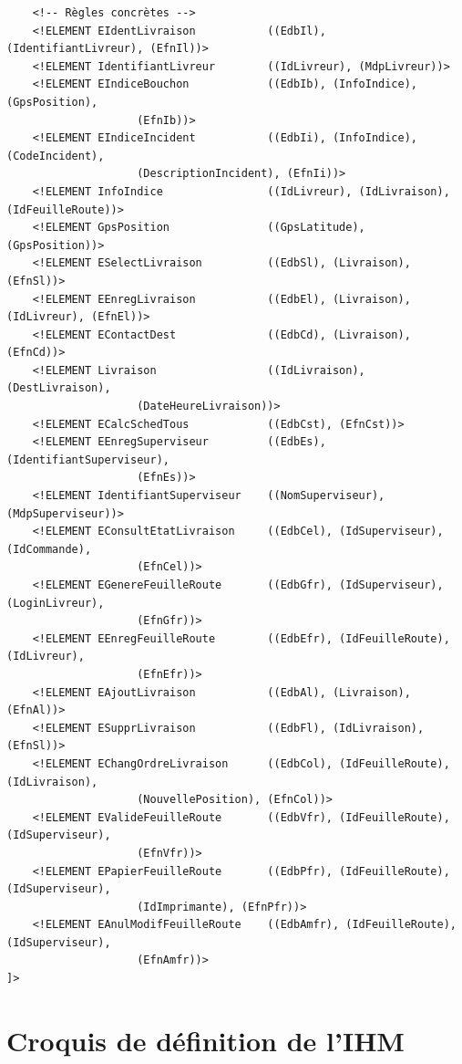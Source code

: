 \documentclass{report}
\begin{document}
\begin{appendices}
\begin{verbatim}
    <!-- Règles concrètes -->
    <!ELEMENT EIdentLivraison           ((EdbIl), (IdentifiantLivreur), (EfnIl))>
    <!ELEMENT IdentifiantLivreur        ((IdLivreur), (MdpLivreur))>
    <!ELEMENT EIndiceBouchon            ((EdbIb), (InfoIndice), (GpsPosition), 
					(EfnIb))>
    <!ELEMENT EIndiceIncident           ((EdbIi), (InfoIndice), (CodeIncident), 
					(DescriptionIncident), (EfnIi))>
    <!ELEMENT InfoIndice                ((IdLivreur), (IdLivraison), (IdFeuilleRoute))>
    <!ELEMENT GpsPosition               ((GpsLatitude), (GpsPosition))>
    <!ELEMENT ESelectLivraison          ((EdbSl), (Livraison), (EfnSl))>
    <!ELEMENT EEnregLivraison           ((EdbEl), (Livraison), (IdLivreur), (EfnEl))>
    <!ELEMENT EContactDest              ((EdbCd), (Livraison), (EfnCd))>
    <!ELEMENT Livraison                 ((IdLivraison), (DestLivraison), 
					(DateHeureLivraison))>
    <!ELEMENT ECalcSchedTous            ((EdbCst), (EfnCst))>
    <!ELEMENT EEnregSuperviseur         ((EdbEs), (IdentifiantSuperviseur), 
					(EfnEs))>
    <!ELEMENT IdentifiantSuperviseur    ((NomSuperviseur), (MdpSuperviseur))>
    <!ELEMENT EConsultEtatLivraison     ((EdbCel), (IdSuperviseur), (IdCommande), 
					(EfnCel))>
    <!ELEMENT EGenereFeuilleRoute       ((EdbGfr), (IdSuperviseur), (LoginLivreur), 
					(EfnGfr))>
    <!ELEMENT EEnregFeuilleRoute        ((EdbEfr), (IdFeuilleRoute), (IdLivreur), 
					(EfnEfr))>
    <!ELEMENT EAjoutLivraison           ((EdbAl), (Livraison), (EfnAl))>
    <!ELEMENT ESupprLivraison           ((EdbFl), (IdLivraison), (EfnSl))>
    <!ELEMENT EChangOrdreLivraison      ((EdbCol), (IdFeuilleRoute), (IdLivraison), 
					(NouvellePosition), (EfnCol))>
    <!ELEMENT EValideFeuilleRoute       ((EdbVfr), (IdFeuilleRoute), (IdSuperviseur), 
					(EfnVfr))>
    <!ELEMENT EPapierFeuilleRoute       ((EdbPfr), (IdFeuilleRoute), (IdSuperviseur), 
					(IdImprimante), (EfnPfr))>
    <!ELEMENT EAnulModifFeuilleRoute    ((EdbAmfr), (IdFeuilleRoute), (IdSuperviseur),
					(EfnAmfr))>
]>

\end{verbatim}

\chapter{Croquis de définition de l'IHM}



\end{appendices}
\end{document}
